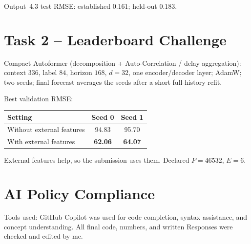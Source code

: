 \documentclass[11pt,a4paper]{article}
\begin{document}
Output~4.3 test RMSE: established $0.161$; held-out $0.183$.

\section{Task 2 -- Leaderboard Challenge}

Compact Autoformer (decomposition + Auto-Correlation / delay aggregation): context $336$, label $84$, horizon $168$, $d{=}32$, one encoder/decoder layer; AdamW; two seeds; final forecast averages the seeds after a short full-history refit.

Best validation RMSE:

\begin{center}
\begin{tabular}{lcc}
\toprule
Setting & Seed 0 & Seed 1 \\
\midrule
Without external features & 94.83 & 95.70 \\
With external features & \textbf{62.06} & \textbf{64.07} \\
\bottomrule
\end{tabular}
\end{center}

External features help, so the submission uses them. Declared $P{=}46532$, $E{=}6$.

\section*{AI Policy Compliance}
Tools used: GitHub Copilot was used for code completion, syntax assistance, and concept understanding. All final code, numbers, and written Responses were checked and edited by me.
\end{document}

